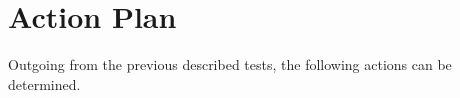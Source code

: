 \section{Action Plan}
Outgoing from the previous described tests, the following actions can be determined.
